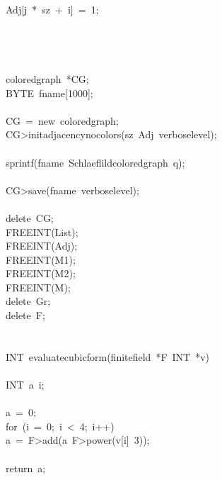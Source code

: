 \begin{tabbing}
\>\>\>\>Adj[j\ *\ sz\ +\ i]\ =\ 1;\\[0pt]
\>\>\>\>\\[0pt]
\>\>\>\\[0pt]
\>\>\\[0pt]
\\[0pt]
\>coloredgraph\ *CG;\\[0pt]
\>BYTE\ fname[1000];\\[0pt]
\\[0pt]
\>CG\ =\ new\ coloredgraph;\\[0pt]
\>CG>initadjacencynocolors(sz\ Adj\ verboselevel);\\[0pt]
\\[0pt]
\>sprintf(fname\ Schlaeflildcoloredgraph\ q);\\[0pt]
\\[0pt]
\>CG>save(fname\ verboselevel);\\[0pt]
\\[0pt]
\>delete\ CG;\\[0pt]
\>FREEINT(List);\\[0pt]
\>FREEINT(Adj);\\[0pt]
\>FREEINT(M1);\\[0pt]
\>FREEINT(M2);\\[0pt]
\>FREEINT(M);\\[0pt]
\>delete\ Gr;\\[0pt]
\>delete\ F;\\[0pt]
\\[0pt]
\\[0pt]
INT\ evaluatecubicform(finitefield\ *F\ INT\ *v)\\[0pt]
\\[0pt]
\>INT\ a\ i;\\[0pt]
\\[0pt]
\>a\ =\ 0;\\[0pt]
\>for\ (i\ =\ 0;\ i\ <\ 4;\ i++)\ \\[0pt]
\>\>a\ =\ F>add(a\ F>power(v[i]\ 3));\\[0pt]
\>\>\\[0pt]
\>return\ a;\\[0pt]
\\[0pt]
\\[0pt]
\end{tabbing}

